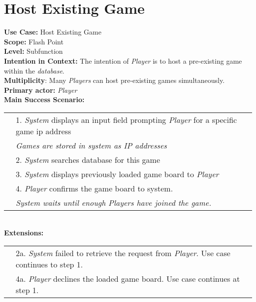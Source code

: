 \documentclass{article}
\begin{document}
	\section*{Host Existing Game}
	\textbf{Use Case:} Host Existing Game\\
	\textbf{Scope:} Flash Point\\
	\textbf{Level:} Subfunction\\
	\textbf{Intention in Context:} The intention of \textit{Player} is to host a pre-existing game within the \textit{database}.\\
	\textbf{Multiplicity}: Many \textit{Players} can host pre-existing games simultaneously.\\
	\textbf{Primary actor:} \textit{Player}\\
	\textbf{Main Success Scenario:}\\
	\begin{tabular}{l l}
		&1. \textit{System} displays an input field prompting \textit{Player} for a specific game ip address\\
		&\qquad\textit{Games are stored in system as IP addresses}\\
		&2. \textit{System} searches database for this game\\
		&3. \textit{System} displays previously loaded game board to \textit{Player}\\
		&4. \textit{Player} confirms the game board to system.\\
		&\qquad\textit{System waits until enough Players have joined the game.}
	\end{tabular}\\
	\textbf{Extensions:}\\
	\begin{tabular}{l l}
		&2a. \textit{System} failed to retrieve the request from \textit{Player}. Use case continues to step 1.\\
		&4a. \textit{Player} declines the loaded game board. Use case continues at step 1.
	\end{tabular}
\end{document}
